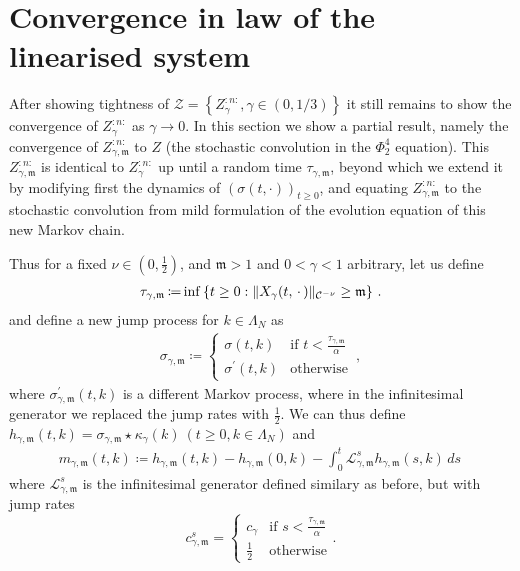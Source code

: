 \documentclass{report}
\DeclarePairedDelimiter\norm{\lVert}{\rVert}%
\newcommand{\Placeholder}{\,\mathrel{\cdot}\,}
\newcommand{\Convolve}[3][]{#2 \star_{#1} #3}
\DeclareMathOperator{\DefiningEquality}{\coloneqq}
\theoremstyle{remark}
\theoremstyle{definition}
\begin{document}
\chapter{Convergence in law of the linearised system}
After showing tightness of $\mathcal{Z} = \left\{Z^{:n:}_\gamma, \gamma\in(0, 1/3)\right\}$ it still remains to show the convergence of $Z^{:n:}_\gamma$ as $\gamma \to 0$. In this section we show a partial result, namely the convergence of $Z^{:n:}_{\gamma, \mathfrak{m}}$ to $Z$ (the stochastic convolution in the $\Phi^4_2$ equation). This $Z^{:n:}_{\gamma, \mathfrak{m}}$ is identical to $Z^{:n:}_{\gamma}$ up until a random time $\tau_{\gamma, \mathfrak{m}}$, beyond which we extend it by modifying first the dynamics of $(\sigma(t, \cdot))_{t \ge 0}$, and equating $Z^{:n:}_{\gamma, \mathfrak{m}}$ to the stochastic convolution from mild formulation of the evolution equation of this new Markov chain.

Thus for a fixed $\nu \in \left(0, \frac{1}{2}\right)$, and $\mathfrak{m} > 1$ and $0 < \gamma < 1$ arbitrary, let us define
\begin{align}
  \tau_{\gamma, \mathfrak{m}} \DefiningEquality \inf \left\{t \ge 0: \norm{X_\gamma(t, \Placeholder)}_{\mathcal{C}^{-\nu}} \ge \mathfrak{m}\right\}\,.
\end{align}
and define a new jump process for $k \in \Lambda_N$ as 
\begin{align*}
  \sigma_{\gamma, \mathfrak{m}} \DefiningEquality \begin{cases}
    \sigma(t, k)&\text{if } t < \frac{\tau_{\gamma, \mathfrak{m}}}{\alpha}\\
    \sigma^\prime(t, k)&\text{otherwise}
  \end{cases}\,,
\end{align*}
where $\sigma^\prime_{\gamma, \mathfrak{m}}(t, k)$ is a different Markov process, where in the infinitesimal generator we replaced the jump rates with $\frac{1}{2}$. We can thus define $h_{\gamma, \mathfrak{m}}(t, k) = \Convolve{\sigma_{\gamma,\mathfrak{m}}}{\kappa_\gamma}(k)~(t \ge 0, k \in \Lambda_N)$ and \begin{align*}
  m_{\gamma, \mathfrak{m}}(t, k) \DefiningEquality h_{\gamma, \mathfrak{m}}(t, k) - h_{\gamma, \mathfrak{m}}(0, k) - \int_{0}^{t} \mathcal{L}^s_{\gamma, \mathfrak{m}} h_{\gamma, \mathfrak{m}}(s, k)\,ds\,
\end{align*}
where $\mathcal{L}^s_{\gamma, \mathfrak{m}}$ is the infinitesimal generator defined similary as before, but with jump rates $$c^s_{\gamma, \mathfrak{m}} = \begin{cases}
  c_\gamma&\text{if }s < \frac{\tau_{\gamma, \mathfrak{m}}}{\alpha}\\
  \frac{1}{2}&\text{otherwise}
\end{cases}.$$
\end{document}
